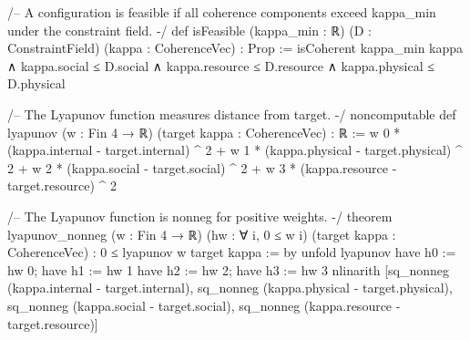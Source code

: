 /-- A configuration is feasible if all coherence components
    exceed kappa_min under the constraint field. -/
def isFeasible (kappa_min : ℝ) (D : ConstraintField)
    (kappa : CoherenceVec) : Prop :=
  isCoherent kappa_min kappa ∧
  kappa.social ≤ D.social ∧
  kappa.resource ≤ D.resource ∧
  kappa.physical ≤ D.physical

/-- The Lyapunov function measures distance from target. -/
noncomputable def lyapunov (w : Fin 4 → ℝ)
    (target kappa : CoherenceVec) : ℝ :=
  w 0 * (kappa.internal - target.internal) ^ 2 +
  w 1 * (kappa.physical - target.physical) ^ 2 +
  w 2 * (kappa.social   - target.social)   ^ 2 +
  w 3 * (kappa.resource - target.resource) ^ 2

/-- The Lyapunov function is nonneg for positive weights. -/
theorem lyapunov_nonneg (w : Fin 4 → ℝ) (hw : ∀ i, 0 ≤ w i)
    (target kappa : CoherenceVec) :
    0 ≤ lyapunov w target kappa := by
  unfold lyapunov
  have h0 := hw 0; have h1 := hw 1
  have h2 := hw 2; have h3 := hw 3
  nlinarith [sq_nonneg (kappa.internal - target.internal),
             sq_nonneg (kappa.physical - target.physical),
             sq_nonneg (kappa.social   - target.social),
             sq_nonneg (kappa.resource - target.resource)]

